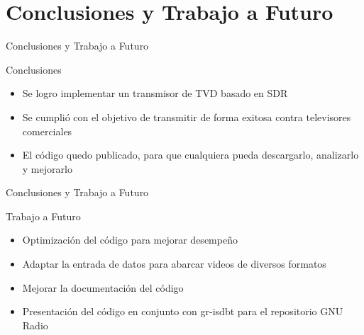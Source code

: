 \section{Conclusiones y Trabajo a Futuro}


\begin{frame}{Conclusiones y Trabajo a Futuro}
\begin{block}{Conclusiones}
	\begin{itemize}
		\item { Se logro implementar un transmisor de TVD basado en SDR }
		\item { Se cumplió con el objetivo de transmitir de forma exitosa contra televisores comerciales }
		\item { El código quedo publicado, para que cualquiera pueda descargarlo, analizarlo y mejorarlo}
	\end{itemize}
\end{block}
\end{frame}


\begin{frame}{Conclusiones y Trabajo a Futuro}
\begin{block}{Trabajo a Futuro}
	\begin{itemize}
		\item { Optimización del código para mejorar desempeño }
		\item { Adaptar la entrada de datos para abarcar videos de diversos formatos }
		\item { Mejorar la documentación del código}
		\item { Presentación del código en conjunto con gr-isdbt para el repositorio GNU Radio}
	\end{itemize}
\end{block}
\end{frame}